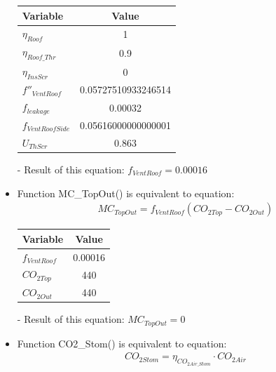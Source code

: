 \documentclass[a4paper]{article}
\begin{document}
\begin{itemize}
        \begin{table}[H]
          \centering
          \begin{tabular}{@{}lS[table-format=1.17]@{}}
            \toprule
            \textbf{Variable}    & \textbf{Value}      \\
            \midrule
            \(\eta_{Roof}\)      & 1                   \\
            \(\eta_{Roof\_Thr}\) & 0.9                 \\
            \(\eta_{InsScr}\)    & 0                   \\
            \(f''_{VentRoof}\)   & 0.05727510933246514 \\
            \(f_{leakage}\)      & 0.00032             \\
            \(f_{VentRoofSide}\) & 0.05616000000000001 \\
            \(U_{ThScr}\)        & 0.863               \\
            \bottomrule
          \end{tabular}
        \end{table}

  \item[-] Result of this equation: \(f_{VentRoof} = 0.00016\)

  \item Function MC\_TopOut() is equivalent to equation:
        \begin{align*}
          MC_{TopOut} = f_{VentRoof}(CO_{2 Top} - CO_{2 Out})
        \end{align*}

        \begin{table}[H]
          \centering
          \begin{tabular}{@{}lS@{}}
            \toprule
            \textbf{Variable} & \textbf{Value} \\
            \midrule
            \(f_{VentRoof}\)  & 0.00016        \\
            \(CO_{2 Top}\)    & 440            \\
            \(CO_{2 Out}\)    & 440            \\
            \bottomrule
          \end{tabular}
        \end{table}

  \item[-] Result of this equation: \( MC_{TopOut} = 0 \)

  \item Function CO2\_Stom() is equivalent to equation:
        \begin{align*}
          CO_{2Stom} = \eta_{CO_{2Air\_Stom}} \cdot CO_{2Air}
        \end{align*}


\end{itemize}
\end{document}
